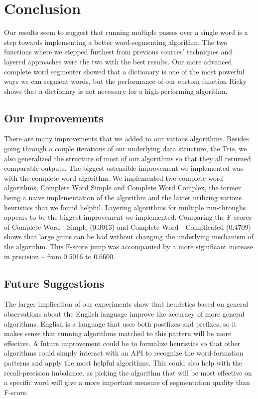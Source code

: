 \documentclass[11pt,letterpaper]{article}
\begin{document}
    
\section{Conclusion}
  
  	Our results seem to suggest that running multiple passes over a single word is a step towards implementing a better word-segmenting algorithm. The two functions where we stepped furthest from previous sources' techniques and layered approaches were the two with the best results. Our more advanced complete word segmenter showed that a dictionary is one of the most powerful ways we can segment words, but the performance of our custom function Ricky shows that a dictionary is not necessary for a high-performing algorithm. 
 
\subsection{Our Improvements}
  
    There are many improvements that we added to our various algorithms.  Besides going through a couple iterations of our underlying data structure, the Trie, we also generalized the structure of most of our algorithms so that they all returned comparable outputs. 
   The biggest ostensible improvement we implemented was with the complete word algorithm.  We implemented two complete word algorithms, Complete Word Simple and Complete Word Complex, the former being a naive implementation of the algorithm and the latter utilizing various heuristics that we found helpful. Layering algorithms for multiple run-throughs appears to be the biggest improvement we implemented. Comparing the F-scores of Complete Word - Simple (0.3913) and Complete Word - Complicated (0.4709) shows that large gains can be had without changing the underlying mechanism of the algorithm. This F-score jump was accompanied by a more significant increase in precision -- from 0.5016 to 0.6600.


\subsection{Future Suggestions}   

  The larger implication of our experiments show that heuristics based on general observations about the English language improve the accuracy of more general algorithms. English is a language that uses both postfixes and prefixes, so it makes sense that running algorithms matched to this pattern will be more effective. A future improvement could be to formalize heuristics so that other algorithms could simply interact with an API to recognize the word-formation patterns and apply the most helpful algorithms. This could also help with the recall-precision imbalance, as picking the algorithm that will be most effective on a specific word will give a more important measure of segmentation quality than F-score.




\end{document}
